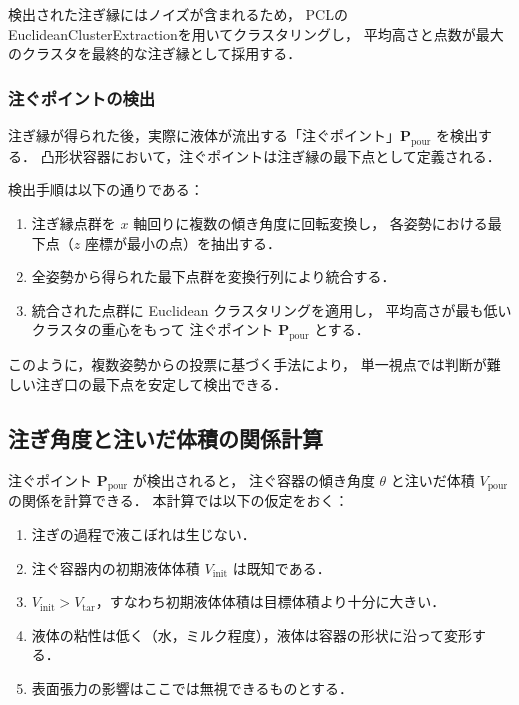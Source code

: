 検出された注ぎ縁にはノイズが含まれるため，
PCLのEuclideanClusterExtractionを用いてクラスタリングし，
平均高さと点数が最大のクラスタを最終的な注ぎ縁として採用する．

\subsubsection{注ぐポイントの検出}

注ぎ縁が得られた後，実際に液体が流出する「注ぐポイント」$\mathbf{P}_{\mathrm{pour}}$
を検出する．
凸形状容器において，注ぐポイントは注ぎ縁の最下点として定義される．

検出手順は以下の通りである：

\begin{enumerate}
  \item 注ぎ縁点群を $x$ 軸回りに複数の傾き角度に回転変換し，
        各姿勢における最下点（$z$ 座標が最小の点）を抽出する．
  \item 全姿勢から得られた最下点群を変換行列により統合する．
  \item 統合された点群に Euclidean クラスタリングを適用し，
        平均高さが最も低いクラスタの重心をもって
        注ぐポイント $\mathbf{P}_{\mathrm{pour}}$ とする．
\end{enumerate}

このように，複数姿勢からの投票に基づく手法により，
単一視点では判断が難しい注ぎ口の最下点を安定して検出できる．

\subsection{注ぎ角度と注いだ体積の関係計算}
\label{sec:pour_angle_volume}

注ぐポイント $\mathbf{P}_{\mathrm{pour}}$ が検出されると，
注ぐ容器の傾き角度 $\theta$ と注いだ体積 $V_{\mathrm{pour}}$ の関係を計算できる．
本計算では以下の仮定をおく：

\begin{enumerate}
  \item 注ぎの過程で液こぼれは生じない．
  \item 注ぐ容器内の初期液体体積 $V_{\mathrm{init}}$ は既知である．
  \item $V_{\mathrm{init}} > V_{\mathrm{tar}}$，すなわち初期液体体積は目標体積より十分に大きい．
  \item 液体の粘性は低く（水，ミルク程度），液体は容器の形状に沿って変形する．
  \item 表面張力の影響はここでは無視できるものとする．
\end{enumerate}

